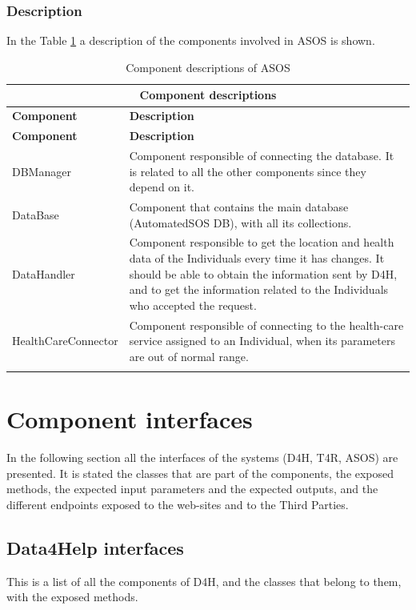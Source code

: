 \documentclass[a4paper, hidelinks, 12pt]{report}
\begin{document}
			\subsubsection{Description}
			In the Table \ref{table:asos_component_descriptions} a description of the components involved in ASOS is shown.
			
		\begin{longtable}{l p{}}
			\hline\hline
			\multicolumn{2}{c}{\textbf{Component descriptions}} \\
			\hline
			\textbf{Component} & \textbf{Description} \\ [0.5ex]
			\hline
			\endfirsthead
			\hline
			\textbf{Component} & \textbf{Description} \\ [0.5ex]
			\hline
			\endhead
			DBManager & Component responsible of connecting the database. It is related to all the other components since they depend on it.\\
			DataBase & Component that contains the main database (AutomatedSOS DB), with all its collections.\\
			DataHandler & Component responsible to get the location and health data of the Individuals every time it has changes. It should be able to obtain the information sent by D4H, and to get the information related to the Individuals who accepted the request.\\
			HealthCareConnector & Component responsible of connecting to the health-care service assigned to an Individual, when its parameters are out of normal range.\\
			\hline
			\caption{Component descriptions of ASOS}
			\label{table:asos_component_descriptions}
		\end{longtable}
		
	\section{Component interfaces}
	In the following section all the interfaces of the systems (D4H, T4R, ASOS) are presented. It is stated the classes that are part of the components, the exposed methods, the expected input parameters and the expected outputs, and the different endpoints exposed to the web-sites and to the Third Parties.
	
	\subsection{Data4Help interfaces}
	This is a list of all the components of D4H, and the classes that belong to them, with the exposed methods. \\
	
\end{document}
